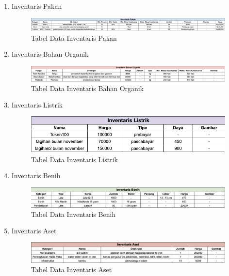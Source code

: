 \begin{enumerate}
	\item Inventaris Pakan
	
	\begin{figure}[H]
		\centering
		\includegraphics[width=1\textwidth]{gambar/tabel_inventaris_pakan.png}
		\caption{Tabel Data Inventaris Pakan}
	\end{figure}	

	\item Inventaris Bahan Organik
	
	\begin{figure}[H]
		\centering
		\includegraphics[width=1\textwidth]{gambar/tabel_inventaris_bahanorganik.png}
		\caption{Tabel Data Inventaris Bahan Organik}
	\end{figure}
	
	\hfill \break

	\item Inventaris Listrik
	
	\begin{figure}[H]
		\centering
		\includegraphics[width=1\textwidth]{gambar/tabel_inventaris_listrik.png}
		\caption{Tabel Data Inventaris Listrik}
	\end{figure}	

	\item Inventaris Benih
	
	\begin{figure}[H]
		\centering
		\includegraphics[width=1\textwidth]{gambar/tabel_inventaris_benih.png}
		\caption{Tabel Data Inventaris Benih}
	\end{figure}	

	\item Inventaris Aset
	
	\begin{figure}[H]
		\centering
		\includegraphics[width=1\textwidth]{gambar/tabel_inventaris_aset.png}
		\caption{Tabel Data Inventaris Aset}
	\end{figure}	

\end{enumerate}

